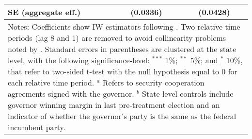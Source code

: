 \begin{table}[htbp]
{\begin{tabular}{lcc}
SE (aggregate eff.)        &              (0.0336)       &           (0.0428)   \\
\hline \hline
\multicolumn{3}{p{0.8\textwidth}}{\footnotesize{Notes: Coefficients show IW estimators following \citet{abraham_sun_2020}. Two relative time periods (lag 8 and 1) are removed to avoid collinearity problems noted by \citet{abraham_sun_2020}. Standard errors in parentheses are clustered at the state level, with the following significance-level: $^{***}$ 1\%; $^{**}$ 5\%; and $^*$ 10\%, that refer to two-sided t-test with the null hypothesis equal to 0 for each relative time period. $^a$ Refers to security cooperation agreements signed with the governor. $^b$ State-level controls include governor winning margin in last pre-treatment election and an indicator of whether the governor's party is the same as the federal incumbent party.}} \\
\end{tabular}
}
\end{table}
